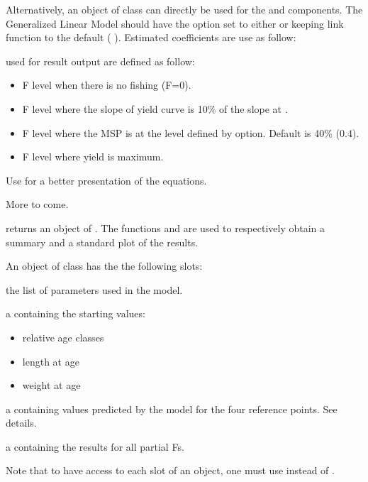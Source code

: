 \documentclass[a4paper]{book}
\begin{document}
\begin{Details}
Alternatively, an object of class  can directly be used for the  and  components. 
The Generalized Linear Model should have  the option  set to either  or  keeping link function to the 
default ( ).
Estimated coefficients are use as follow: 


 used for result output are defined as follow:
\begin{itemize}

\item {}  F level when there is no fishing (F=0).
\item {}    F level where the slope of yield curve is 10\% of the slope at . 
\item {}    F level where the MSP is at the level defined by  option. Default is 40\% (0.4).
\item {}   F level where yield is maximum.

\end{itemize}



Use  for a better presentation of the equations.  

More to come.
\end{Details}
%
\begin{Value}
 returns an object of  . The functions  and  are used to respectively
obtain a summary and a standard plot of the results.  

An object of class  has the the following slots:


\begin{ldescription}
\item[\code{parms}] the list of parameters used in the model.
\item[\code{base}] a  containing the starting values:
\begin{itemize}

\item relative age classes
\item length at age
\item weight at age

\end{itemize}


\item[\code{refs}] a  containing values predicted by the model for the four reference points. See details. 
\item[\code{YPR}] a  containing the results for all partial Fs.


\end{ldescription}
Note that to have access to each slot of an  object, one must use  instead of .
\end{Value}
\end{document}
